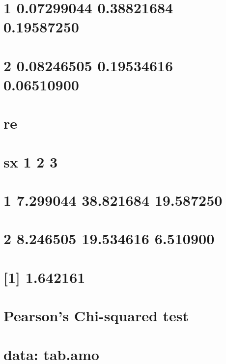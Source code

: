 \documentclass[]{book}
\theoremstyle{definition}
\theoremstyle{definition}
\theoremstyle{definition}
\theoremstyle{remark}
\begin{document}
\section{1 0.07299044 0.38821684 0.19587250}\label{section-81}

\section{2 0.08246505 0.19534616 0.06510900}\label{section-82}

\section{re}\label{re-2}

\section{sx 1 2 3}\label{sx-1-2-3-2}

\section{1 7.299044 38.821684 19.587250}\label{section-83}

\section{2 8.246505 19.534616 6.510900}\label{section-84}

\section{{[}1{]} 1.642161}\label{section-85}

\section{}\label{section-86}

\section{Pearson's Chi-squared test}\label{pearsons-chi-squared-test}

\section{}\label{section-87}

\section{data: tab.amo}\label{data-tab.amo}
\end{document}
